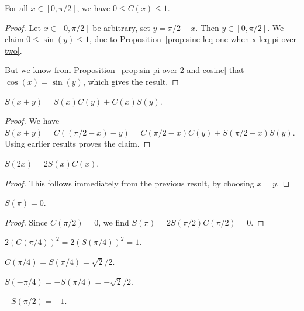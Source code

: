 \begin{proposition}
For all $x\in[0,\pi/2]$, we have $0\leq C(x)\leq 1$.
\end{proposition}
\begin{proof}
  Let $x\in[0,\pi/2]$ be arbitrary, set $y=\pi/2-x$. Then $y\in[0,\pi/2]$.
  We claim $0\leq\sin(y)\leq 1$, due to Proposition~\ref{prop:sine-leq-one-when-x-leq-pi-over-two}.

  But we know from Proposition~\ref{prop:sin-pi-over-2-and-cosine} that
  $\cos(x)=\sin(y)$, which gives the result.
\end{proof}

\begin{proposition}
$S(x + y) = S(x)C(y) + C(x)S(y)$.
\end{proposition}
\begin{proof}
We have $S(x + y) = C((\pi/2 - x) - y) = C(\pi/2 - x)C(y) + S(\pi/2 - x)S(y)$.
Using earlier results proves the claim.
\end{proof}

\begin{proposition}
$S(2x) = 2S(x)C(x)$.
\end{proposition}

\begin{proof}
  This follows immediately from the previous result, by choosing $x=y$.
\end{proof}

\begin{proposition}
$S(\pi) = 0$.
\end{proposition}

\begin{proof}
  Since $C(\pi/2)=0$, we find $S(\pi)=2S(\pi/2)C(\pi/2)=0$.
\end{proof}

\begin{proposition}
$2(C(\pi/4))^{2} = 2(S(\pi/4))^{2} = 1$.
\end{proposition}

\begin{proposition}
$C(\pi/4) = S(\pi/4) = \sqrt{2}/2$.
\end{proposition}

\begin{proposition}
$S(-\pi/4) = -S(\pi/4) = -\sqrt{2}/2$.
\end{proposition}

\begin{proposition}
$-S(\pi/2)=-1$.
\end{proposition}

